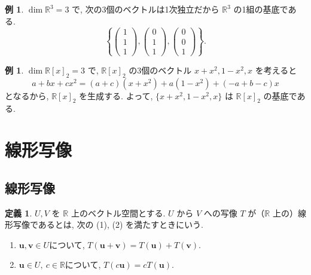 \documentclass[dvipdfmx,a4paper,11pt]{article} %
\theoremstyle{definition}
\newtheorem{defn}[thm]{定義}
\newtheorem{ex}[thm]{例}
\begin{document}
\begin{ex}
$\dim\mathbb{R}^3=3$ で, 次の3個のベクトルは1次独立だから $\mathbb{R}^3$ の1組の基底である.
\[
\left\{
\begin{pmatrix}
1\\
1\\
1
\end{pmatrix},
\begin{pmatrix}
0\\
1\\
1
\end{pmatrix},
\begin{pmatrix}
0\\
0\\
1
\end{pmatrix}
\right\}.
\]
\end{ex}
\begin{ex}%
$\dim\mathbb{R}[x]_2=3$ で, $\mathbb{R}[x]_2$ の3個のベクトル $x+x^2,1-x^2,x$ を考えると
\[
a+bx+cx^2
=
(a+c)(x+x^2)+a(1-x^2)+(-a+b-c)x
\]
となるから, $\mathbb{R}[x]_2$ を生成する. よって, $\{x+x^2,1-x^2,x\}$ は $\mathbb{R}[x]_2$ の基底である.
\end{ex}

\newpage


\section{線形写像 \cite[5章]{M}}

\subsection{線形写像\cite[5.1 節]{M}}

\begin{defn}
\(U,V\) を \(\mathbb{R}\) 上のベクトル空間とする. \(U\) から \(V\) への写像 \(T\) が（\(\mathbb{R}\) 上の）線形写像であるとは, 次の (1), (2) を満たすときにいう.
\begin{enumerate}
\item 
$\bm{u},\bm{v}\in U$について, 
\(
T(\bm{u}+\bm{v})=T(\bm{u})+T(\bm{v})
\).

\item
$\bm{u}\in U,\ c\in\mathbb{R}$について, 
\(
T(c\bm{u})=cT(\bm{u})
\).
\end{enumerate}
\end{defn}
\end{document}
